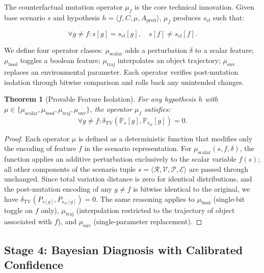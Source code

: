 \documentclass[journal]{IEEEtran}
\theoremstyle{plain}
\newtheorem{theorem}{Theorem}[section]
\newcommand{\Prob}{\mathbb{P}}
\newcommand{\TV}[2]{\delta_{\mathrm{TV}}\left(#1,#2\right)}
\begin{document}
The counterfactual mutation operator $\mu_f$ is the core technical innovation. Given base scenario $s$ and hypothesis $h = \langle f, C, \mu, A_{\text{pred}} \rangle$, $\mu_f$ produces $s_{\text{cf}}$ such that:

\begin{equation}
\forall g \neq f: s[g] = s_{\text{cf}}[g], \quad s[f] \neq s_{\text{cf}}[f].
\end{equation}

We define four operator classes: $\mu_{\text{scalar}}$ adds a perturbation $\delta$ to a scalar feature; $\mu_{\text{bool}}$ toggles a boolean feature; $\mu_{\text{traj}}$ interpolates an object trajectory; $\mu_{\text{env}}$ replaces an environmental parameter. Each operator verifies post-mutation isolation through bitwise comparison and rolls back any unintended changes.

\begin{theorem}[Provable Feature Isolation]\label{thm:isolation}
For any hypothesis $h$ with $\mu \in \{\mu_{\text{scalar}},\mu_{\text{bool}},\mu_{\text{traj}},\mu_{\text{env}}\}$, the operator $\mu_f$ satisfies:
\begin{equation}
\forall g \neq f: \TV{\Prob_{s}[g]}{\Prob_{s_{\text{cf}}}[g]} = 0.
\end{equation}
\end{theorem}

\begin{proof}
Each operator $\mu$ is defined as a deterministic function that modifies only the encoding of feature $f$ in the scenario representation. For $\mu_{\text{scalar}}(s,f,\delta)$, the function applies an additive perturbation exclusively to the scalar variable $f(s)$; all other components of the scenario tuple $s = \langle \mathcal{R}, \mathcal{V}, \mathcal{P}, \mathcal{E} \rangle$ are passed through unchanged. Since total variation distance is zero for identical distributions, and the post-mutation encoding of any $g \neq f$ is bitwise identical to the original, we have $\TV{P_{s[g]}}{P_{s_{\text{cf}}[g]}} = 0$. The same reasoning applies to $\mu_{\text{bool}}$ (single-bit toggle on $f$ only), $\mu_{\text{traj}}$ (interpolation restricted to the trajectory of object associated with $f$), and $\mu_{\text{env}}$ (single-parameter replacement).
\end{proof}

\subsection{Stage 4: Bayesian Diagnosis with Calibrated Confidence}
\end{document}
